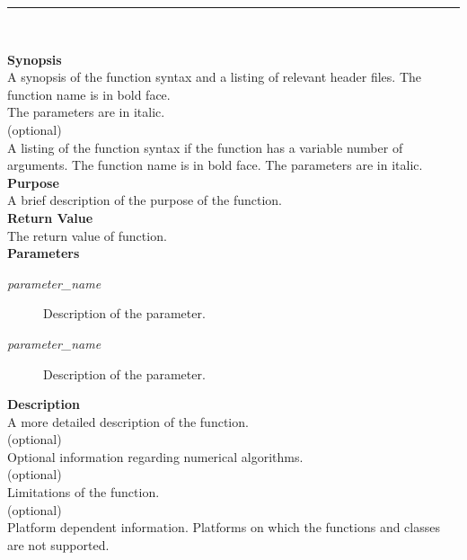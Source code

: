 \newpage
\rhead{\function}
\noindent
\vspace{5pt}
\rule{6.5in}{.01in}
\noindent
{\Large \function}\\

\noindent
{\bf Synopsis}\\
A synopsis of the function syntax and a listing of relevant header files.
The function name is in bold face.\\
The parameters are in italic.\\

\noindent
[{\bf Syntax}] (optional)\\
A listing of the function syntax if the function has a variable number
of arguments.
The function name is in bold face.
The parameters are in italic.\\

\noindent
{\bf Purpose}\\
A brief description of the purpose of the function.\\

\noindent
{\bf Return Value}\\
The return value of function.\\

\noindent
{\bf Parameters}
\vspace*{-7.5pt}
\begin{description}
\item[{\it parameter\_name}] Description of the parameter.
\item[{\it parameter\_name}] Description of the parameter.
\end{description}

\noindent
{\bf Description}\\
A more detailed description of the function. \\

\noindent
[{\bf Algorithm}] (optional)\\
Optional information
regarding numerical algorithms. \\

\noindent
[{\bf Limitations}] (optional)\\
Limitations of the function.\\

\noindent
[{\bf Portability}] (optional)\\
Platform dependent information.
Platforms on which the functions and classes are not supported.\\

